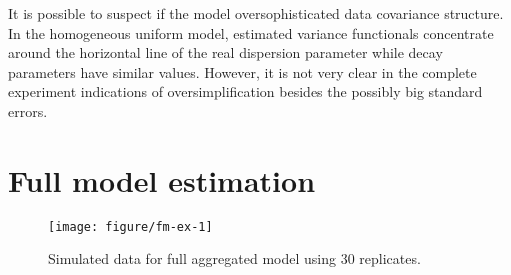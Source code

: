 It is possible to suspect if the model oversophisticated data covariance structure. In the homogeneous uniform model, estimated variance functionals concentrate around the horizontal line of the real dispersion parameter while decay parameters have similar values. However, it is not very clear in the complete experiment indications of oversimplification besides the possibly big standard errors. 































\section{Full model estimation}
\label{sec:simu-fm}


\begin{figure}[t]
  \centering
\begin{knitrout}
\color{fgcolor}
\texttt{[image: figure/fm-ex-1]} 

\end{knitrout}
  \caption{Simulated data for full aggregated model using 30 replicates.}
  \label{fig:fm-ex}
\end{figure}


